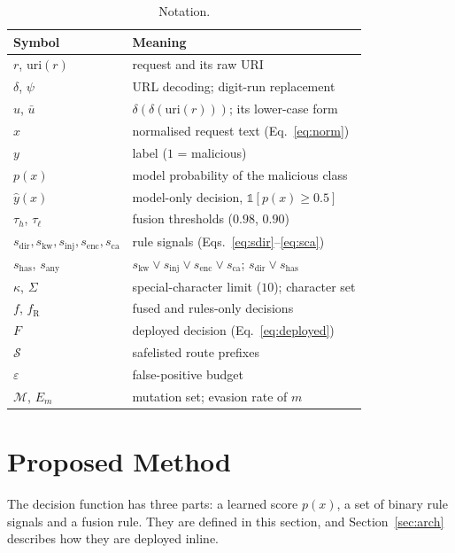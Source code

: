 \documentclass[preprint,11pt]{elsarticle}
\let\footnotesize\normalsize
\begin{document}
\begin{table}[t]
\centering
\caption{Notation.}
\label{tab:notation}
\footnotesize
\begin{tabular}{@{}ll@{}}
\toprule
Symbol & Meaning \\
\midrule
$r$, $\mathrm{uri}(r)$ & request and its raw URI \\
$\delta$, $\psi$ & URL decoding; digit-run replacement \\
$u$, $\bar u$ & $\delta(\delta(\mathrm{uri}(r)))$; its lower-case form \\
$x$ & normalised request text (Eq.~\eqref{eq:norm}) \\
$y$ & label ($1$ = malicious) \\
$p(x)$ & model probability of the malicious class \\
$\hat y(x)$ & model-only decision, $\mathbb{1}[p(x)\ge0.5]$ \\
$\tau_h$, $\tau_\ell$ & fusion thresholds ($0.98$, $0.90$) \\
$s_{\text{dir}},s_{\text{kw}},s_{\text{inj}},s_{\text{enc}},s_{\text{ca}}$ & rule signals (Eqs.~\eqref{eq:sdir}--\eqref{eq:sca}) \\
$s_{\text{has}}$, $s_{\text{any}}$ & $s_{\text{kw}}\vee s_{\text{inj}}\vee s_{\text{enc}}\vee s_{\text{ca}}$; $s_{\text{dir}}\vee s_{\text{has}}$ \\
$\kappa$, $\Sigma$ & special-character limit ($10$); character set \\
$f$, $f_{\text{R}}$ & fused and rules-only decisions \\
$F$ & deployed decision (Eq.~\eqref{eq:deployed}) \\
$\mathcal{S}$ & safelisted route prefixes \\
$\varepsilon$ & false-positive budget \\
$\mathcal{M}$, $E_m$ & mutation set; evasion rate of $m$ \\
\bottomrule
\end{tabular}
\end{table}

\section{Proposed Method}
\label{sec:method}
The decision function has three parts: a learned score $p(x)$, a set of
binary rule signals and a fusion rule. They are defined in this section,
and Section~\ref{sec:arch} describes how they are deployed inline.
\end{document}
